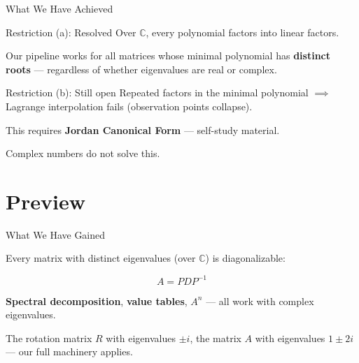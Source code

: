 \documentclass[10pt]{beamer}
\theoremstyle{definition}
\newcommand{\x}[1]{\alert{\textbf{#1}}}
\begin{document}
\begin{frame}{What We Have Achieved}

\begin{block}{Restriction (a): Resolved}
Over $\mathbb{C}$, every polynomial factors into linear factors.

\vfill

Our pipeline works for all matrices whose minimal polynomial has \x{distinct roots} --- regardless of whether eigenvalues are real or complex.
\end{block}

\vfill\pause

\begin{block}{Restriction (b): Still open}
Repeated factors in the minimal polynomial $\implies$ Lagrange interpolation fails (observation points collapse).

\vfill

This requires \x{Jordan Canonical Form} --- self-study material.

\vfill

Complex numbers do not solve this.
\end{block}

\end{frame}


\section{Preview}


\begin{frame}{What We Have Gained}

Every matrix with distinct eigenvalues (over $\mathbb{C}$) is diagonalizable:

$$A = PDP^{-1}$$

\vfill

\x{Spectral decomposition}, \x{value tables}, \x{$A^n$} --- all work with complex eigenvalues.

\vfill

The rotation matrix $R$ with eigenvalues $\pm i$, the matrix $A$ with eigenvalues $1 \pm 2i$ --- our full machinery applies.

\end{frame}
\end{document}
